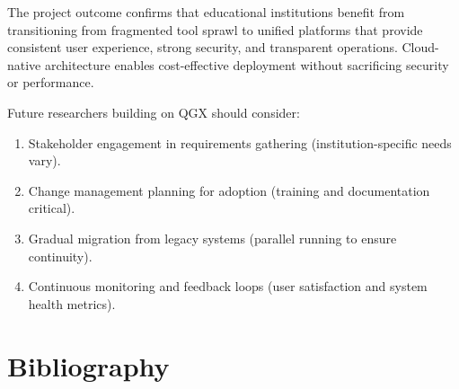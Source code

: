 \documentclass[11pt,a4paper]{article}
\begin{document}
The project outcome confirms that educational institutions benefit from transitioning from fragmented tool sprawl to unified platforms that provide consistent user experience, strong security, and transparent operations. Cloud-native architecture enables cost-effective deployment without sacrificing security or performance.

Future researchers building on QGX should consider:

\begin{enumerate}
    \item Stakeholder engagement in requirements gathering (institution-specific needs vary).
    \item Change management planning for adoption (training and documentation critical).
    \item Gradual migration from legacy systems (parallel running to ensure continuity).
    \item Continuous monitoring and feedback loops (user satisfaction and system health metrics).
\end{enumerate}


\newpage
\section*{Bibliography}

\small

\begingroup
\renewcommand{\section}[2]{}
\end{document}
